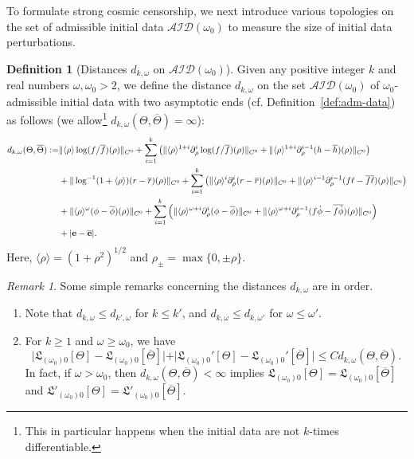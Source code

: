 \documentclass[10pt, reqno]{amsart}
\theoremstyle{definition}
\newtheorem{definition}[theorem]{Definition}
\theoremstyle{remark}
\newtheorem{remark}[theorem]{Remark}
\numberwithin{equation}{section}
\newcommand{\nrm}[1]{\Vert#1\Vert}
\newcommand{\abs}[1]{\vert#1\vert}
\newcommand{\brk}[1]{\langle#1\rangle}
\newcommand{\set}[1]{\{#1\}}
\newcommand{\rd}{\partial}
\newcommand{\0}{\emptyset}
\newcommand{\Tht}{\Theta}
\newcommand{\omg}{\omega}
\newcommand{\calA}{\mathcal A}
\newcommand{\calD}{\mathcal D}
\newcommand{\calI}{\mathcal I}
\newcommand{\phibg}{\overline{\phi}}				%
\newcommand{\rbg}{\overline{r}}					%
\newcommand{\fbg}{\overline{f}}
\newcommand{\hbg}{\overline{h}}
\begin{document}
To formulate strong cosmic censorship, we next introduce various topologies on the set of admissible initial data $\calA \calI \calD(\omg_{0})$ to measure the size of initial data perturbations.
\begin{definition} [Distances $d_{k,\omg}$ on $\calA \calI \calD(\omg_{0})$] \label{def:adm-top}
Given any positive integer $k$ and real numbers $\omg, \omg_{0} > 2$, we define the distance $d_{k, \omg}$ on the set $\calA \calI \calD(\omg_{0})$ of $\omg_{0}$-admissible initial data with two asymptotic ends (cf. Definition~\ref{def:adm-data}) as follows (we allow\footnote{This in particular happens when the initial data are not $k$-times differentiable.} $d_{k, \omg} (\Tht, \overline{\Tht}) = \infty$): 
\begin{equation} \label{eq:d-k-omg}
\begin{aligned}
	d_{k, \omg} (\Tht, \overline{\Tht}) := 
	& \nrm{\brk{\rho} \log (f/\fbg)(\rho)}_{C^{0}} 
	+ \sum_{i = 1}^{k} \left(  \nrm{\brk{\rho}^{1+i} \rd_{\rho}^{i} \log (f /\fbg)(\rho)}_{C^{0}} 
					+ \nrm{\brk{\rho}^{1+i} \rd_{\rho}^{i-1} (h - \hbg)(\rho)}_{C^{0}} \right) \\
	& + \nrm{\log^{-1}(1+\brk{\rho}) (r - \rbg) (\rho)}_{C^{0}} 
	+ \sum_{i=1}^{k} \left(  \nrm{\brk{\rho}^{i} \rd_{\rho}^{i} (r - \rbg) (\rho)}_{C^{0}} 
					+ \nrm{\brk{\rho}^{i-1} \rd_{\rho}^{i-1} (f \ell - \overline{f \ell})(\rho)}_{C^{0}} \right) \\
	& + \nrm{\brk{\rho}^{\omg} (\phi - \phibg)(\rho)}_{C^{0}} 
	+ \sum_{i=1}^{k} \left(  \nrm{\brk{\rho}^{\omg+i} \rd_{\rho}^{i} (\phi - \phibg)}_{C^{0}} 
	+ \nrm{\brk{\rho}^{\omg+i} \rd_{\rho}^{i-1} (f \dot{\phi} - \overline{f \dot{\phi}})(\rho)}_{C^{0}} \right) \\
  & + |{\bf e}- \overline{\bf e}|												.
\end{aligned}\end{equation}
Here, $\brk{\rho} = (1 + \rho^{2})^{1/2}$ and $\rho_{\pm} = \max\set{0, \pm \rho}$.
\end{definition}
 
\begin{remark} \label{rem:adm-top}
Some simple remarks concerning the distances $d_{k, \omg}$ are in order.
\begin{enumerate}
\item Note that $d_{k, \omg} \leq d_{k', \omg}$ for $k \leq k'$, and $d_{k, \omg} \leq d_{k, \omg'}$ for $\omg \leq \omg'$.
\item For $k \geq 1$ and $\omg \geq \omg_{0}$, we have
\begin{equation*}
	\abs{\mathfrak{L}_{(\omg_{0}) 0}[\Tht] - \mathfrak{L}_{(\omg_{0}) 0}[\overline{\Tht}]}
	+ \abs{\mathfrak{L}_{(\omg_{0}) 0}'[\Tht] - \mathfrak{L}_{(\omg_{0}) 0}'[\overline{\Tht}]}
	\leq C d_{k, \omg} (\Tht, \overline{\Tht}).
\end{equation*}
In fact, if $\omg > \omg_{0}$, then $d_{k, \omg} (\Tht, \overline{\Tht}) < \infty$ implies 
$\mathfrak{L}_{(\omg_{0}) 0}[\Tht] = \mathfrak{L}_{(\omg_{0}) 0}[\overline{\Tht}]$ and $\mathfrak{L}'_{(\omg_{0}) 0}[\Tht] = \mathfrak{L}'_{(\omg_{0}) 0}[\overline{\Tht}]$.
\end{enumerate}
\end{remark}
\end{document}
